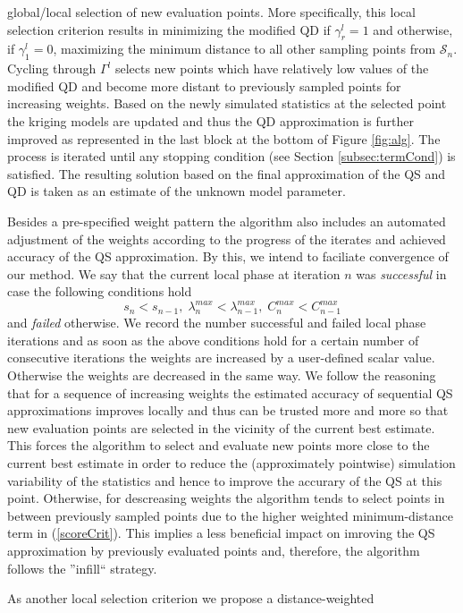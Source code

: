 \documentclass[article, nojss]{jss}
\numberwithin{equation}{section}			%
\newcommand{\Sample}{\mathcal{S}}
\begin{document}
global/local selection of new evaluation points. More specifically, this 
local selection criterion results in minimizing the modified QD if
$\gamma^l_r=1$ and otherwise, if $\gamma^l_1=0$, maximizing the minimum distance to all other sampling
points from $\Sample_n$. Cycling through $\Gamma^l$ selects new points which
have relatively low values of the modified QD and become more distant to previously sampled points
for increasing weights. Based on the newly simulated statistics at the selected
point the kriging models are updated and thus the QD approximation is further
improved as represented in the last block at the bottom of Figure \ref{fig:alg}. The process is
iterated until any stopping condition (see Section \ref{subsec:termCond})
is satisfied. The resulting solution based on the final approximation of the QS
and QD is taken as an estimate of the unknown model parameter.\par
%
Besides a pre-specified weight pattern the algorithm also includes an automated
adjustment of the weights according to the progress of the iterates and achieved
accuracy of the QS approximation. By this, we intend to faciliate convergence
of our method. We say that the current local phase at iteration $n$ was
\emph{successful} in case the following conditions hold
\[
 s_n<s_{n-1},\; \lambda^{max}_n<\lambda^{max}_{n-1},\; C^{max}_n<C^{max}_{n-1}
\]
and \emph{failed} otherwise. We record the number successful and failed local
phase iterations and as soon as the above conditions hold for a certain
number of consecutive iterations the weights are increased by a user-defined
scalar value. Otherwise the weights are decreased in the same way. We follow the
reasoning that for a sequence of increasing weights the estimated accuracy of
sequential QS approximations improves locally and thus can be trusted more and
more so that new evaluation points are selected in the vicinity of the current
best estimate. This forces the algorithm to select and evaluate new points more close
to the current best estimate in order to reduce the (approximately pointwise)
simulation variability of the statistics and hence to improve the accurary of
the QS at this point. Otherwise, for descreasing weights the algorithm
tends to select points in between previously sampled points due to the higher
weighted minimum-distance term in (\ref{scoreCrit}). This implies a less
beneficial impact on imroving the QS approximation by previously evaluated
points and, therefore, the algorithm follows the ''infill`` strategy.\par
%
As another local selection criterion we propose a distance-weighted
\end{document}
